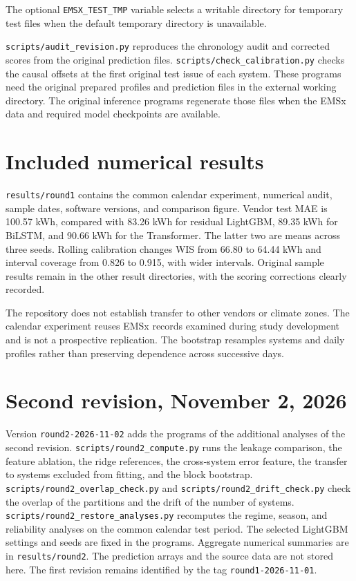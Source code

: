 The optional \texttt{EMSX\_TEST\_TMP} variable selects a writable directory for
temporary test files when the default temporary directory is unavailable.

\texttt{scripts/audit\_revision.py} reproduces the chronology audit and corrected
scores from the original prediction files. \texttt{scripts/check\_calibration.py}
checks the causal offsets at the first original test issue of each system.
These programs need the original prepared profiles and prediction files in the
external working directory. The original inference programs regenerate those
files when the EMSx data and required model checkpoints are available.

\section*{Included numerical results}

\texttt{results/round1} contains the common calendar experiment, numerical audit,
sample dates, software versions, and comparison figure. Vendor test MAE is
100.57 kWh, compared with 83.26 kWh for residual LightGBM, 89.35 kWh for BiLSTM,
and 90.66 kWh for the Transformer. The latter two are means across three seeds.
Rolling calibration changes WIS from 66.80 to 64.44 kWh and interval coverage
from 0.826 to 0.915, with wider intervals. Original sample results remain in the
other result directories, with the scoring corrections clearly recorded.

The repository does not establish transfer to other vendors or climate zones.
The calendar experiment reuses EMSx records examined during study development
and is not a prospective replication. The bootstrap resamples systems and daily
profiles rather than preserving dependence across successive days.

\section*{Second revision, November 2, 2026}

Version \texttt{round2-2026-11-02} adds the programs of the additional analyses
of the second revision. \texttt{scripts/round2\_compute.py} runs the leakage
comparison, the feature ablation, the ridge references, the cross-system error
feature, the transfer to systems excluded from fitting, and the block bootstrap.
\texttt{scripts/round2\_overlap\_check.py} and \texttt{scripts/round2\_drift\_check.py}
check the overlap of the partitions and the drift of the number of systems.
\texttt{scripts/round2\_restore\_analyses.py} recomputes the regime, season, and
reliability analyses on the common calendar test period. The selected LightGBM
settings and seeds are fixed in the programs. Aggregate numerical summaries are in
\texttt{results/round2}. The prediction arrays and the source data are not stored
here. The first revision remains identified by the tag \texttt{round1-2026-11-01}.
